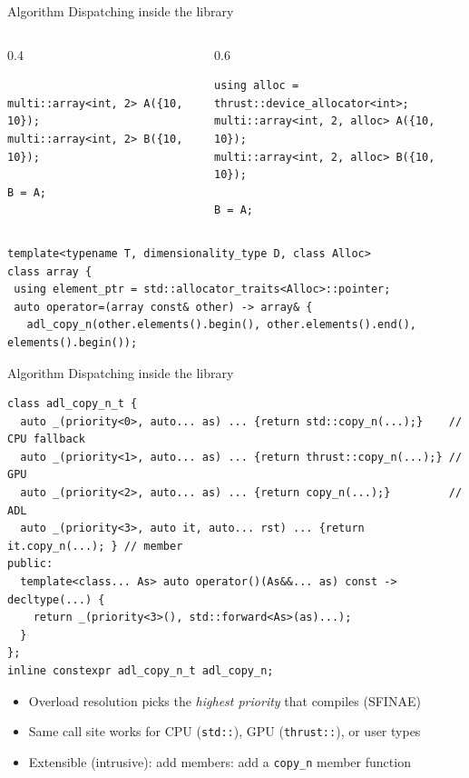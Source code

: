 \documentclass[t,aspectratio=169,handout]{beamer}
\begin{document}
\begin{frame}[t,fragile,label=allocator4]{Algorithm Dispatching inside the library}
\begin{columns}[T]
\begin{column}{0.4\textwidth}
\begin{lstlisting}

multi::array<int, 2> A({10, 10});
multi::array<int, 2> B({10, 10});

B = A;
\end{lstlisting}
\end{column}
\begin{column}{0.6\textwidth}
\begin{lstlisting}
using alloc = thrust::device_allocator<int>;
multi::array<int, 2, alloc> A({10, 10});
multi::array<int, 2, alloc> B({10, 10});

B = A;
\end{lstlisting}
\end{column}
\end{columns}
\begin{lstlisting}
template<typename T, dimensionality_type D, class Alloc>
class array {
 using element_ptr = std::allocator_traits<Alloc>::pointer;
 auto operator=(array const& other) -> array& {
   adl_copy_n(other.elements().begin(), other.elements().end(), elements().begin());
\end{lstlisting}
\begin{center}

\end{center}
\end{frame}

\begin{frame}[fragile]{Algorithm Dispatching inside the library}
\begin{lstlisting}
class adl_copy_n_t {
  auto _(priority<0>, auto... as) ... {return std::copy_n(...);}    // CPU fallback
  auto _(priority<1>, auto... as) ... {return thrust::copy_n(...);} // GPU
  auto _(priority<2>, auto... as) ... {return copy_n(...);}         // ADL
  auto _(priority<3>, auto it, auto... rst) ... {return it.copy_n(...); } // member
public:
  template<class... As> auto operator()(As&&... as) const -> decltype(...) {
    return _(priority<3>(), std::forward<As>(as)...);
  }
};
inline constexpr adl_copy_n_t adl_copy_n;
\end{lstlisting}

\medskip
\begin{itemize}
  \item Overload resolution picks the \emph{highest priority} that compiles (SFINAE)
  \item Same call site works for CPU (\lstinline|std::|), GPU (\lstinline|thrust::|), or user types
  \item Extensible (intrusive): add members: add a \lstinline|copy_n| member function
\end{itemize}

\end{frame}
\end{document}
